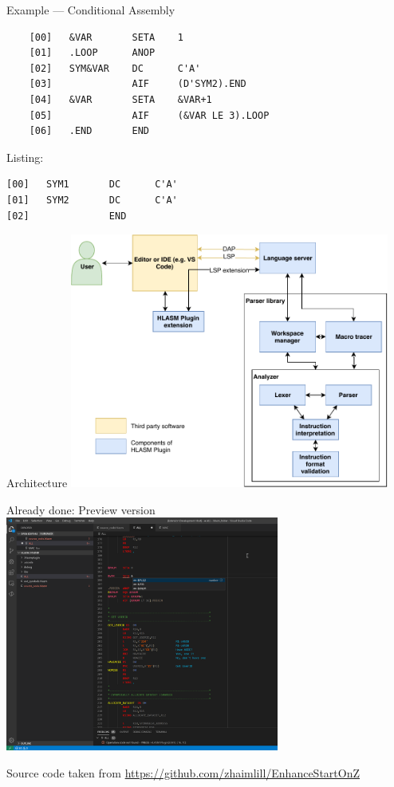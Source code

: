 \documentclass[10pt]{beamer}
\begin{document}
\begin{frame}[fragile]{Example --- Conditional Assembly}


\begin{verbatim}
	[00]   &VAR       SETA    1
	[01]   .LOOP      ANOP         
	[02]   SYM&VAR    DC      C'A'
	[03]              AIF     (D'SYM2).END
	[04]   &VAR       SETA    &VAR+1
	[05]              AIF     (&VAR LE 3).LOOP
	[06]   .END       END     
\end{verbatim}

\pause
Listing:
\begin{verbatim}
[00]   SYM1       DC      C'A'
[01]   SYM2       DC      C'A'
[02]              END
\end{verbatim}

\end{frame}

\begin{frame}{Architecture}
\centering
\includegraphics[width=10.5cm]{img/hlasm_architecture}
\end{frame}


\begin{frame}{Already done: Preview version}
\centering
\includegraphics[width=9cm]{img/screenshot}

\footnotesize
Source code taken from \url{https://github.com/zhaimlill/EnhanceStartOnZ}
\end{frame}
\end{document}
